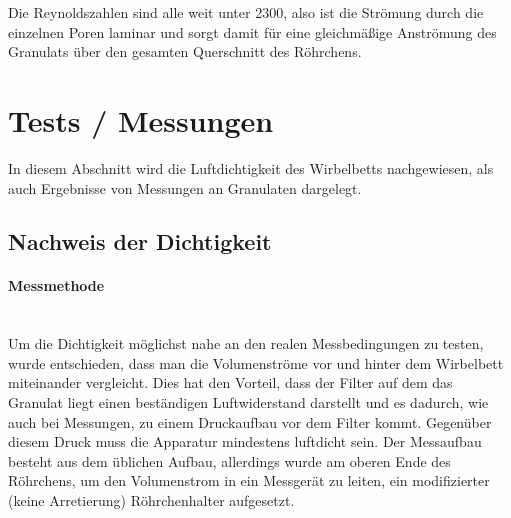 Die Reynoldszahlen sind alle weit unter 2300, also ist die Strömung durch die einzelnen Poren laminar und sorgt damit für eine gleichmäßige Anströmung des Granulats über den gesamten Querschnitt des Röhrchens.

\newpage

\section{Tests / Messungen}

In diesem Abschnitt wird die Luftdichtigkeit des Wirbelbetts nachgewiesen, als auch Ergebnisse von Messungen an Granulaten dargelegt.

\subsection{Nachweis der Dichtigkeit}

\paragraph{Messmethode}
\hfill \\
Um die Dichtigkeit möglichst nahe an den realen Messbedingungen zu testen, wurde entschieden, dass man die Volumenströme vor und hinter dem Wirbelbett miteinander vergleicht. Dies hat den Vorteil, dass der Filter auf dem das Granulat liegt einen beständigen Luftwiderstand darstellt und es dadurch, wie auch bei Messungen, zu einem Druckaufbau vor dem Filter kommt. Gegenüber diesem Druck muss die Apparatur mindestens luftdicht sein. Der Messaufbau besteht aus dem üblichen Aufbau, allerdings wurde am oberen Ende des Röhrchens, um den Volumenstrom in ein Messgerät zu leiten, ein modifizierter (keine Arretierung) Röhrchenhalter aufgesetzt. 

